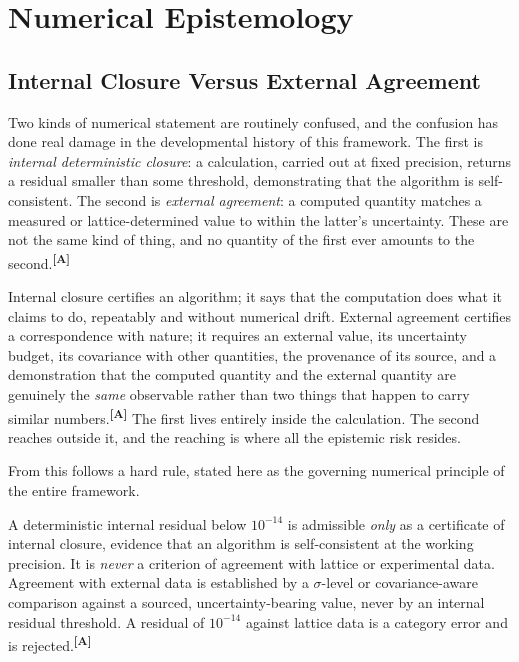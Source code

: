 \documentclass[12pt,a4paper,twoside]{article}
\theoremstyle{plain}
\theoremstyle{definition}
\theoremstyle{remark}
\newcommand{\catmark}[1]{\textsuperscript{\textsf{\textbf{[#1]}}}}
\begin{document}
\section{Numerical Epistemology}
\label{sec:numerical-epistemology}

\subsection{Internal Closure Versus External Agreement}
\label{subsec:closure-vs-agreement}

Two kinds of numerical statement are routinely confused, and the confusion has done real damage in the developmental history of this framework. The first is \emph{internal deterministic closure}: a calculation, carried out at fixed precision, returns a residual smaller than some threshold, demonstrating that the algorithm is self-consistent. The second is \emph{external agreement}: a computed quantity matches a measured or lattice-determined value to within the latter's uncertainty. These are not the same kind of thing, and no quantity of the first ever amounts to the second.\catmark{A}

Internal closure certifies an algorithm; it says that the computation does what it claims to do, repeatably and without numerical drift. External agreement certifies a correspondence with nature; it requires an external value, its uncertainty budget, its covariance with other quantities, the provenance of its source, and a demonstration that the computed quantity and the external quantity are genuinely the \emph{same} observable rather than two things that happen to carry similar numbers.\catmark{A} The first lives entirely inside the calculation. The second reaches outside it, and the reaching is where all the epistemic risk resides.

From this follows a hard rule, stated here as the governing numerical principle of the entire framework.

\begin{governancebox}
A deterministic internal residual below $10^{-14}$ is admissible \emph{only} as a certificate of internal closure, evidence that an algorithm is self-consistent at the working precision. It is \emph{never} a criterion of agreement with lattice or experimental data. Agreement with external data is established by a $\sigma$-level or covariance-aware comparison against a sourced, uncertainty-bearing value, never by an internal residual threshold. A residual of $10^{-14}$ against lattice data is a category error and is rejected.\catmark{A}
\end{governancebox}
\end{document}
